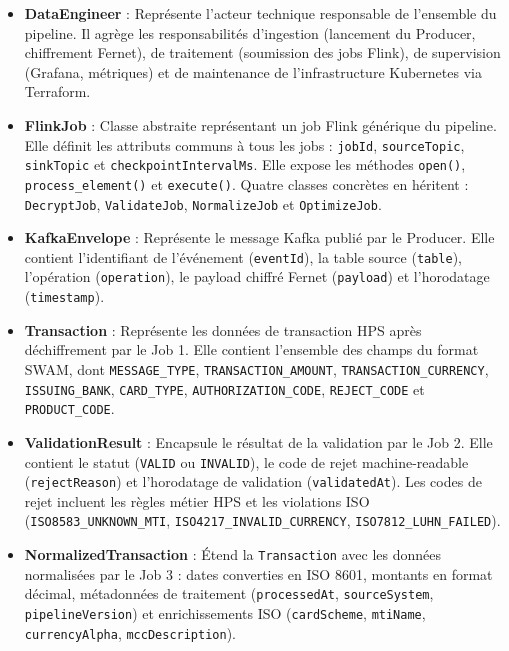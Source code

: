 \begin{itemize}[leftmargin=1.5cm]

    \item \textbf{DataEngineer} : Représente l'acteur technique responsable de l'ensemble du pipeline. Il agrège les responsabilités d'ingestion (lancement du Producer, chiffrement Fernet), de traitement (soumission des jobs Flink), de supervision (Grafana, métriques) et de maintenance de l'infrastructure Kubernetes via Terraform.

    \item \textbf{FlinkJob} : Classe abstraite représentant un job Flink générique du pipeline. Elle définit les attributs communs à tous les jobs : \texttt{jobId}, \texttt{sourceTopic}, \texttt{sinkTopic} et \texttt{checkpointIntervalMs}. Elle expose les méthodes \texttt{open()}, \texttt{process\_element()} et \texttt{execute()}. Quatre classes concrètes en héritent : \texttt{DecryptJob}, \texttt{ValidateJob}, \texttt{NormalizeJob} et \texttt{OptimizeJob}.

    \item \textbf{KafkaEnvelope} : Représente le message Kafka publié par le Producer. Elle contient l'identifiant de l'événement (\texttt{eventId}), la table source (\texttt{table}), l'opération (\texttt{operation}), le payload chiffré Fernet (\texttt{payload}) et l'horodatage (\texttt{timestamp}).

    \item \textbf{Transaction} : Représente les données de transaction HPS après déchiffrement par le Job 1. Elle contient l'ensemble des champs du format SWAM, dont \texttt{MESSAGE\_TYPE}, \texttt{TRANSACTION\_AMOUNT}, \texttt{TRANSACTION\_CURRENCY}, \texttt{ISSUING\_BANK}, \texttt{CARD\_TYPE}, \texttt{AUTHORIZATION\_CODE}, \texttt{REJECT\_CODE} et \texttt{PRODUCT\_CODE}.

    \item \textbf{ValidationResult} : Encapsule le résultat de la validation par le Job 2. Elle contient le statut (\texttt{VALID} ou \texttt{INVALID}), le code de rejet machine-readable (\texttt{rejectReason}) et l'horodatage de validation (\texttt{validatedAt}). Les codes de rejet incluent les règles métier HPS et les violations ISO (\texttt{ISO8583\_UNKNOWN\_MTI}, \texttt{ISO4217\_INVALID\_CURRENCY}, \texttt{ISO7812\_LUHN\_FAILED}).

    \item \textbf{NormalizedTransaction} : Étend la \texttt{Transaction} avec les données normalisées par le Job 3 : dates converties en ISO 8601, montants en format décimal, métadonnées de traitement (\texttt{processedAt}, \texttt{sourceSystem}, \texttt{pipelineVersion}) et enrichissements ISO (\texttt{cardScheme}, \texttt{mtiName}, \texttt{currencyAlpha}, \texttt{mccDescription}).


\end{itemize}
